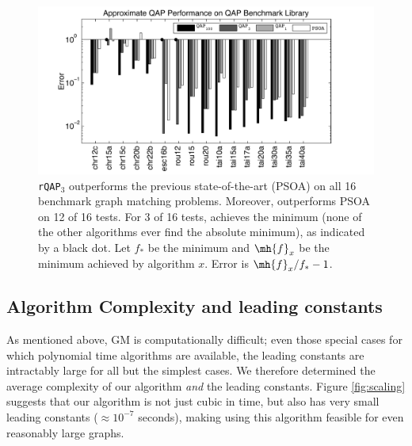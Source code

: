 \documentclass[10pt,journal,cspaper,compsoc]{IEEEtran}
\begin{document}
\begin{figure}[htbp]
	\centering			
	\includegraphics[width=1.0\linewidth]{../figs/benchmarks.pdf}
	\caption{\texttt{rQAP}$_3$ outperforms the previous state-of-the-art (PSOA) on all 16 benchmark graph matching problems.  Moreover, \rqapa outperforms PSOA on 12 of 16 tests.  For 3 of 16 tests, \rqapb achieves the minimum (none of the other algorithms ever find the absolute minimum), as indicated by a black dot.  Let $f_*$ be the minimum and $\mh{f}_x$ be the minimum achieved by algorithm $x$.  Error is $\mh{f}_x/f_*-1$.  }
	\label{fig:fwpath}
\end{figure}




\subsection{Algorithm Complexity and leading constants} %
\label{sub:algorithm_complexity_and_leading_constants}

As mentioned above, GM is computationally difficult; even those special cases for which polynomial time algorithms are available, the leading constants are intractably large for all but the simplest cases. We therefore determined the average complexity of our algorithm \emph{and} the leading constants.  Figure \ref{fig:scaling} suggests that our algorithm is not just cubic in time, but also has very small leading constants ($\approx 10^{-7}$ seconds), making using this algorithm feasible for even reasonably large graphs.
\end{document}
